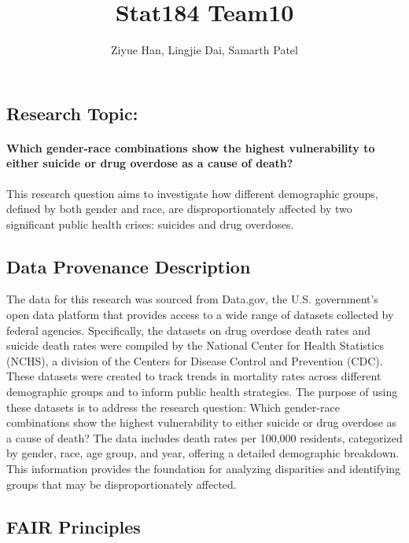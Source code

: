 \documentclass[
  letterpaper,
  DIV=11,
  numbers=noendperiod]{scrartcl}
\title{Stat184 Team10}
\author{Ziyue Han, Lingjie Dai, Samarth Patel}
\date{}
\let\oldparagraph\paragraph
\renewcommand{\paragraph}[1]{\oldparagraph{#1}\mbox{}}
\begin{document}
\maketitle

\subsection{Research Topic:}\label{research-topic}

\paragraph{Which gender-race combinations show the highest vulnerability
to either suicide or drug overdose as a cause of
death?}\label{which-gender-race-combinations-show-the-highest-vulnerability-to-either-suicide-or-drug-overdose-as-a-cause-of-death}

This research question aims to investigate how different demographic
groups, defined by both gender and race, are disproportionately affected
by two significant public health crises: suicides and drug overdoses.

\subsection{Data Provenance
Description}\label{data-provenance-description}

The data for this research was sourced from Data.gov, the U.S.
government's open data platform that provides access to a wide range of
datasets collected by federal agencies. Specifically, the datasets on
drug overdose death rates and suicide death rates were compiled by the
National Center for Health Statistics (NCHS), a division of the Centers
for Disease Control and Prevention (CDC). These datasets were created to
track trends in mortality rates across different demographic groups and
to inform public health strategies. The purpose of using these datasets
is to address the research question: Which gender-race combinations show
the highest vulnerability to either suicide or drug overdose as a cause
of death? The data includes death rates per 100,000 residents,
categorized by gender, race, age group, and year, offering a detailed
demographic breakdown. This information provides the foundation for
analyzing disparities and identifying groups that may be
disproportionately affected.

\subsection{FAIR Principles}\label{fair-principles}
\end{document}
